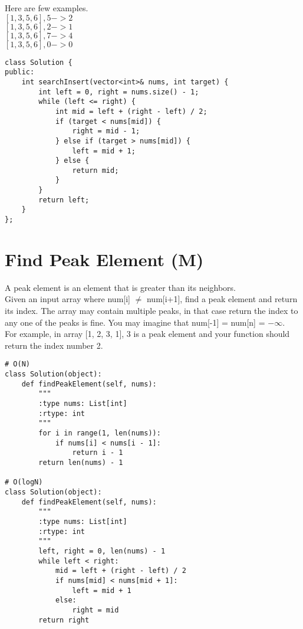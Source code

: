 Here are few examples.\\
$[1,3,5,6], 5 -> 2$\\
$[1,3,5,6], 2 -> 1$\\
$[1,3,5,6], 7 -> 4$\\
$[1,3,5,6], 0 -> 0$\\

\begin{lstlisting}
class Solution {
public:
    int searchInsert(vector<int>& nums, int target) {
        int left = 0, right = nums.size() - 1;
        while (left <= right) {
            int mid = left + (right - left) / 2;
            if (target < nums[mid]) {
                right = mid - 1;
            } else if (target > nums[mid]) {
                left = mid + 1;
            } else {
                return mid;
            }
        }
        return left;
    }
};
\end{lstlisting}


\section{Find Peak Element (M)}
A peak element is an element that is greater than its neighbors.\\

Given an input array where num[i] $\neq$ num[i+1], find a peak element and return its index.
The array may contain multiple peaks, in that case return the index to any one of the peaks is fine.
You may imagine that num[-1] = num[n] = $-\infty$.\\

For example, in array [1, 2, 3, 1], 3 is a peak element and your function should return the index number 2.\\

\begin{lstlisting}
# O(N)
class Solution(object):
    def findPeakElement(self, nums):
        """
        :type nums: List[int]
        :rtype: int
        """
        for i in range(1, len(nums)):
            if nums[i] < nums[i - 1]:
                return i - 1
        return len(nums) - 1
    
# O(logN)
class Solution(object):
    def findPeakElement(self, nums):
        """
        :type nums: List[int]
        :rtype: int
        """
        left, right = 0, len(nums) - 1
        while left < right:
            mid = left + (right - left) / 2
            if nums[mid] < nums[mid + 1]:
                left = mid + 1
            else:
                right = mid
        return right
\end{lstlisting}

